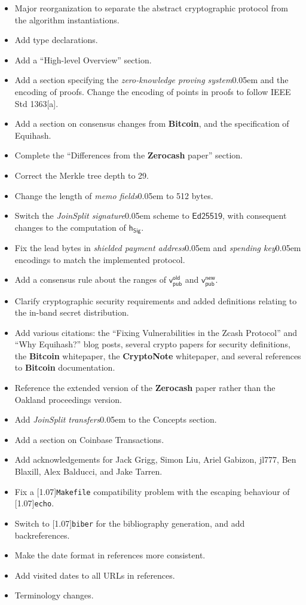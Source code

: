 \documentclass{article}
\let\oldtexttt\texttt
\renewcommand{\texttt}[1]{\scalebox{0.97}[1.07]{\oldtexttt{#1}}}
\numberwithin{theorem}{subsection}
\newcommand{\term}[1]{\textsl{#1}\kern 0.05em\xspace}
\newcommand{\termbf}[1]{\textbf{#1}\xspace}
\newcommand{\Zerocash}{\termbf{Zerocash}}
\newcommand{\Bitcoin}{\termbf{Bitcoin}}
\newcommand{\CryptoNote}{\termbf{CryptoNote}}
\newcommand{\joinSplitTransfers}{\term{JoinSplit transfers}}
\newcommand{\joinSplitSignature}{\term{JoinSplit signature}}
\newcommand{\zeroKnowledgeProvingSystem}{\term{zero-knowledge proving system}}
\newcommand{\paymentAddress}{\term{shielded payment address}}
\newcommand{\spendingKey}{\term{spending key}}
\newcommand{\memos}{\term{memo fields}}
\newcommand{\JoinSplitSigSpecific}{\mathsf{Ed25519}}
\newcommand{\hSig}{\mathsf{h_{Sig}}}
\newcommand{\vpubOld}{\mathsf{v_{pub}^{old}}}
\newcommand{\vpubNew}{\mathsf{v_{pub}^{new}}}
\begin{document}
\begin{itemize}
    \item Major reorganization to separate the abstract cryptographic protocol
          from the algorithm instantiations.
    \item Add type declarations.
    \item Add a ``High-level Overview'' section.
    \item Add a section specifying the \zeroKnowledgeProvingSystem and the
          encoding of proofs. Change the encoding of points in proofs to follow
          IEEE Std 1363[a].
    \item Add a section on consensus changes from \Bitcoin, and the specification
          of Equihash.
    \item Complete the ``Differences from the \Zerocash paper'' section.
    \item Correct the Merkle tree depth to 29.
    \item Change the length of \memos to 512 bytes.
    \item Switch the \joinSplitSignature scheme to $\JoinSplitSigSpecific$, with consequent
          changes to the computation of $\hSig$.
    \item Fix the lead bytes in \paymentAddress and \spendingKey encodings to
          match the implemented protocol.
    \item Add a consensus rule about the ranges of $\vpubOld$ and $\vpubNew$.
    \item Clarify cryptographic security requirements and added definitions
          relating to the in-band secret distribution.
    \item Add various citations: the ``Fixing Vulnerabilities in the Zcash
          Protocol'' and ``Why Equihash?'' blog posts, several crypto papers
          for security definitions, the \Bitcoin whitepaper, the \CryptoNote
          whitepaper, and several references to \Bitcoin documentation.
    \item Reference the extended version of the \Zerocash paper rather than the
          Oakland proceedings version.
    \item Add \joinSplitTransfers to the Concepts section.
    \item Add a section on Coinbase Transactions.
    \item Add acknowledgements for Jack Grigg, Simon Liu, Ariel Gabizon, jl777,
          Ben Blaxill, Alex Balducci, and Jake Tarren.
    \item Fix a \texttt{Makefile} compatibility problem with the escaping behaviour
          of \texttt{echo}.
    \item Switch to \texttt{biber} for the bibliography generation, and add
          backreferences.
    \item Make the date format in references more consistent.
    \item Add visited dates to all URLs in references.
    \item Terminology changes.
\end{itemize}
\end{document}
